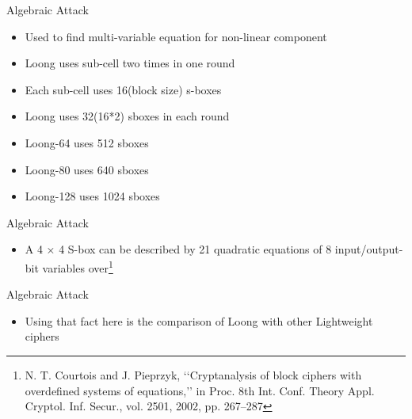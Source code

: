 \begin{frame}{Algebraic Attack}
    \begin{itemize}
        \item Used to find multi-variable equation for non-linear component
        \pause
        \item Loong uses sub-cell two times in one round 
        \pause
        \item Each sub-cell uses 16(block size) s-boxes
        \pause
        \item Loong uses 32(16*2) sboxes in each round
        \pause
        \item Loong-64 uses 512 sboxes 
        \pause
        \item Loong-80 uses 640 sboxes
        \pause
        \item Loong-128 uses 1024 sboxes
    \end{itemize}
\end{frame}

\begin{frame}{Algebraic Attack}
    \begin{itemize}
        \item A 4 × 4 S-box can be described by 21 quadratic equations of 8 input/output-bit variables over\footnote{N. T. Courtois and J. Pieprzyk, ‘‘Cryptanalysis of block ciphers with
overdefined systems of equations,’’ in Proc. 8th Int. Conf. Theory Appl.
Cryptol. Inf. Secur., vol. 2501, 2002, pp. 267–287}
    \end{itemize}
\end{frame}

\begin{frame}{Algebraic Attack}
    \begin{itemize}
        \item Using that fact here is the comparison of Loong with other Lightweight ciphers\\ \vspace{0.6cm}
    \end{itemize}
\end{frame}

